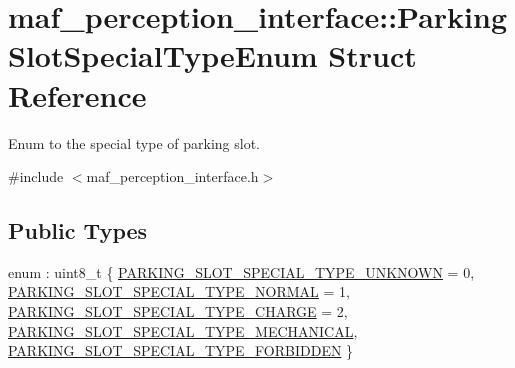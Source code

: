 \hypertarget{structmaf__perception__interface_1_1ParkingSlotSpecialTypeEnum}{}\section{maf\+\_\+perception\+\_\+interface\+:\+:Parking\+Slot\+Special\+Type\+Enum Struct Reference}
\label{structmaf__perception__interface_1_1ParkingSlotSpecialTypeEnum}


Enum to the special type of parking slot.  




{\ttfamily \#include $<$maf\+\_\+perception\+\_\+interface.\+h$>$}

\subsection*{Public Types}
\begin{DoxyCompactItemize}
\item 
enum \+: uint8\+\_\+t \{ \newline
\hyperlink{structmaf__perception__interface_1_1ParkingSlotSpecialTypeEnum_aad8aebca920fc913940ba353bb2dc8a2ab413dc7f6e11b4d5889464f1ebb2494d}{P\+A\+R\+K\+I\+N\+G\+\_\+\+S\+L\+O\+T\+\_\+\+S\+P\+E\+C\+I\+A\+L\+\_\+\+T\+Y\+P\+E\+\_\+\+U\+N\+K\+N\+O\+WN} = 0, 
\hyperlink{structmaf__perception__interface_1_1ParkingSlotSpecialTypeEnum_aad8aebca920fc913940ba353bb2dc8a2a2f98f8638f104c0e6a2599cb1bee6bda}{P\+A\+R\+K\+I\+N\+G\+\_\+\+S\+L\+O\+T\+\_\+\+S\+P\+E\+C\+I\+A\+L\+\_\+\+T\+Y\+P\+E\+\_\+\+N\+O\+R\+M\+AL} = 1, 
\hyperlink{structmaf__perception__interface_1_1ParkingSlotSpecialTypeEnum_aad8aebca920fc913940ba353bb2dc8a2a3c91a1ff37e92f05851bbfb72f5ad6c9}{P\+A\+R\+K\+I\+N\+G\+\_\+\+S\+L\+O\+T\+\_\+\+S\+P\+E\+C\+I\+A\+L\+\_\+\+T\+Y\+P\+E\+\_\+\+C\+H\+A\+R\+GE} = 2, 
\hyperlink{structmaf__perception__interface_1_1ParkingSlotSpecialTypeEnum_aad8aebca920fc913940ba353bb2dc8a2a39a09526a30a867f12560050bb40be77}{P\+A\+R\+K\+I\+N\+G\+\_\+\+S\+L\+O\+T\+\_\+\+S\+P\+E\+C\+I\+A\+L\+\_\+\+T\+Y\+P\+E\+\_\+\+M\+E\+C\+H\+A\+N\+I\+C\+AL}, 
\newline
\hyperlink{structmaf__perception__interface_1_1ParkingSlotSpecialTypeEnum_aad8aebca920fc913940ba353bb2dc8a2a9bce46f8bab603097786de3034888b9b}{P\+A\+R\+K\+I\+N\+G\+\_\+\+S\+L\+O\+T\+\_\+\+S\+P\+E\+C\+I\+A\+L\+\_\+\+T\+Y\+P\+E\+\_\+\+F\+O\+R\+B\+I\+D\+D\+EN}
 \}
\end{DoxyCompactItemize}
